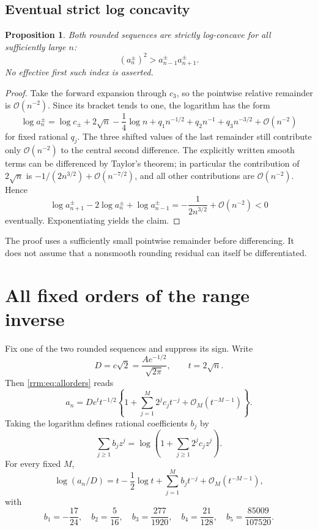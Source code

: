 \documentclass[11pt]{article}
\newtheorem{proposition}[theorem]{Proposition}
\theoremstyle{remark}\newtheorem{remark}[theorem]{Remark}
\newcommand{\OO}{\mathcal O}
\begin{document}
\subsection{Eventual strict log concavity}
\begin{proposition}\label{rrm:prop:logconcavity}
Both rounded sequences are strictly log-concave for all sufficiently large $n$:
\begin{equation}\label{rrm:eq:logconcave}
 (a_n^\pm)^2>a_{n-1}^\pm a_{n+1}^\pm.
\end{equation}
No effective first such index is asserted.
\end{proposition}
\begin{proof}
Take the forward expansion through $c_3$, so the pointwise relative remainder is $\OO(n^{-2})$. Since its bracket tends to one, the logarithm has the form
\[
 \log a_n^\pm=\log c_\pm+2\sqrt n-\frac14\log n
 +q_1n^{-1/2}+q_2n^{-1}+q_3n^{-3/2}+\OO(n^{-2})
\]
for fixed rational $q_j$. The three shifted values of the last remainder still contribute only $\OO(n^{-2})$ to the central second difference. The explicitly written smooth terms can be differenced by Taylor's theorem; in particular the contribution of $2\sqrt n$ is $-1/(2n^{3/2})+\OO(n^{-7/2})$, and all other contributions are $\OO(n^{-2})$. Hence
\begin{equation}\label{rrm:eq:secondlog}
 \log a_{n+1}^\pm-2\log a_n^\pm+\log a_{n-1}^\pm
 =-\frac1{2n^{3/2}}+\OO(n^{-2})<0
\end{equation}
eventually. Exponentiating yields the claim.
\end{proof}

The proof uses a sufficiently small pointwise remainder before differencing. It does not assume that a nonsmooth rounding residual can itself be differentiated.

\section{All fixed orders of the range inverse}\label{rrm:sec:inverse}
Fix one of the two rounded sequences and suppress its sign. Write
\begin{equation}\label{rrm:eq:Dt}
 D=c\sqrt2=\frac{Ae^{-1/2}}{\sqrt{2\pi}},\qquad t=2\sqrt n.
\end{equation}
Then \eqref{rrm:eq:allorders} reads
\begin{equation}\label{rrm:eq:tforward}
 a_n=De^tt^{-1/2}
 \left\{1+\sum_{j=1}^M2^jc_jt^{-j}+\OO_M(t^{-M-1})\right\}.
\end{equation}
Taking the logarithm defines rational coefficients $b_j$ by
\begin{equation}\label{rrm:eq:blog}
 \sum_{j\ge1}b_jz^j
 =\log\left(1+\sum_{j\ge1}2^jc_jz^j\right).
\end{equation}
For every fixed $M$,
\begin{equation}\label{rrm:eq:logforward}
 \log(a_n/D)=t-\frac12\log t+
 \sum_{j=1}^M b_jt^{-j}+\OO_M(t^{-M-1}),
\end{equation}
with
\begin{equation}\label{rrm:eq:bvalues}
 b_1=-\frac{17}{24},\quad b_2=\frac5{16},\quad
 b_3=\frac{277}{1920},\quad b_4=\frac{21}{128},\quad
 b_5=\frac{85009}{107520}.
\end{equation}
\end{document}
